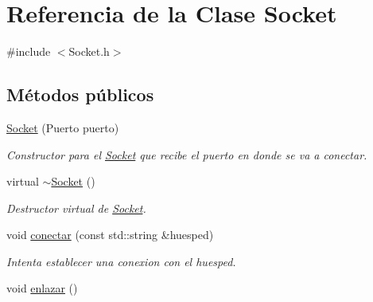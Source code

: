 \hypertarget{classSocket}{\section{\-Referencia de la \-Clase \-Socket}
\label{classSocket}
}


{\ttfamily \#include $<$\-Socket.\-h$>$}

\subsection*{\-Métodos públicos}
\begin{DoxyCompactItemize}
\item 
\hyperlink{classSocket_aecd84cd77e3c7906c9b6bc62eb139e94}{\-Socket} (\-Puerto puerto)
\begin{DoxyCompactList}\small\item\em \-Constructor para el \hyperlink{classSocket}{\-Socket} que recibe el puerto en donde se va a conectar. \end{DoxyCompactList}\item 
\hypertarget{classSocket_aeac4eb6379a543d38ed88977d3b6630a}{virtual \hyperlink{classSocket_aeac4eb6379a543d38ed88977d3b6630a}{$\sim$\-Socket} ()}\label{classSocket_aeac4eb6379a543d38ed88977d3b6630a}

\begin{DoxyCompactList}\small\item\em \-Destructor virtual de \hyperlink{classSocket}{\-Socket}. \end{DoxyCompactList}\item 
void \hyperlink{classSocket_a4b072b1d4e02bb676b4d2bfc17bc252c}{conectar} (const std\-::string \&huesped)
\begin{DoxyCompactList}\small\item\em \-Intenta establecer una conexion con el huesped. \end{DoxyCompactList}\item 
\hypertarget{classSocket_a96467ca6d4fda8fb3d9fbc6818ec5c39}{void \hyperlink{classSocket_a96467ca6d4fda8fb3d9fbc6818ec5c39}{enlazar} ()}\label{classSocket_a96467ca6d4fda8fb3d9fbc6818ec5c39}


\end{DoxyCompactItemize}
